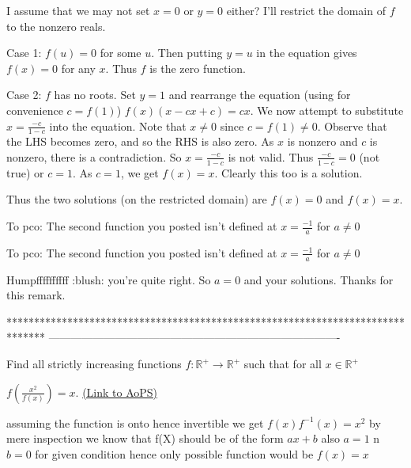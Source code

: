 \begin{solution}
	I assume that we may not set $x=0$ or $y=0$ either? I'll restrict the domain of $f$ to the nonzero reals.

Case 1: $f(u)=0$ for some $u$. Then putting $y=u$ in the equation gives $f(x)=0$ for any $x$. Thus $f$ is the zero function.

Case 2: $f$ has no roots. Set $y=1$ and rearrange the equation (using for convenience $c=f(1)$)
$f(x)(x-cx+c)=cx$.
We now attempt to substitute $x= \frac{-c}{1-c}$ into the equation. Note that $x \neq 0$ since $c =f(1) \neq 0$.
Observe that the LHS becomes zero, and so the RHS is also zero. As $x$ is nonzero and $c$ is nonzero, there is a contradiction. So $x= \frac{-c}{1-c}$ is not valid. Thus $\frac{-c}{1-c}=0$ (not true) or $c=1$.
As $c=1$, we get $f(x)=x$. Clearly this too is a solution.

Thus the two solutions (on the restricted domain) are $f(x)=0$ and $f(x)=x$.

To pco: The second function you posted isn't defined at $x= \frac{-1}{a}$ for $a \neq 0$
\end{solution}



\begin{solution}
	\begin{tcolorbox}To pco: The second function you posted isn't defined at $x= \frac{-1}{a}$ for $a \neq 0$\end{tcolorbox}
Humpffffffffff :blush:  you're quite right. So $a=0$ and your solutions.
Thanks for this remark.
\end{solution}
*******************************************************************************
-------------------------------------------------------------------------------

\begin{problem}
	Find all strictly increasing functions $f:\mathbb R^+ \longrightarrow \mathbb R^+$ such that for all $x\in \mathbb R^+$

$f(\frac{x^2}{f(x)})=x$.
	\flushright \href{https://artofproblemsolving.com/community/c6h474473}{(Link to AoPS)}
\end{problem}



\begin{solution}
	assuming the function is onto hence invertible
we get $f(x) f^{-1} (x) =x^2$ 
by mere inspection we know that f(X) should be of the form $ax+b$ also $a=1$ n $b=0$ for given condition hence only possible function would be $f(x)=x$
\end{solution}



